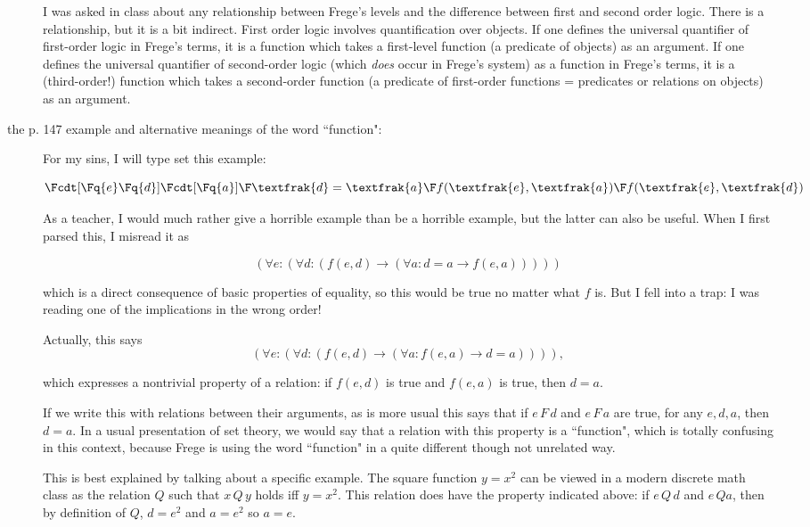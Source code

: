 \documentclass[12pt]{article}
\begin{document}
\begin{description}
I was asked in class about any relationship between Frege's levels and the difference between first and second order logic.  There is a relationship, but it is a bit indirect.
First order logic involves quantification over objects.  If one defines the universal quantifier of first-order logic in Frege's terms, it is a function which takes a first-level function
(a predicate of objects) as an argument.  If one defines the universal quantifier of second-order logic (which {\em does\/} occur in Frege's system) as a function in Frege's terms, 
it is a (third-order!) function which takes a second-order function (a predicate of first-order functions = predicates or relations on objects) as an argument.

\item[the p. 147 example and alternative meanings of the word ``function":]

For my sins, I will type set this example:

$$\Fcdt[\Fq{e}\Fq{d}]{\Fcdt[\Fq{a}]{\F \textfrak{d}=\textfrak{a}}{\F f(\textfrak{e},\textfrak{a})}}{\F f(\textfrak{e},\textfrak{d})} $$

As a teacher, I would much rather give a horrible example than be a horrible example, but the latter can also be useful.  When I first parsed this, I misread it as

$$(\forall e:(\forall d:(f(e,d) \rightarrow (\forall a:d=a \rightarrow f(e,a)))))$$

which is a direct consequence of basic properties of equality, so this would be true no matter what $f$ is.  But I fell into a trap:  I was reading one of the implications in the wrong order!

Actually, this says $$(\forall e:(\forall d:(f(e,d) \rightarrow (\forall a:f(e,a)\rightarrow d=a)))),$$

which expresses a nontrivial property of a relation:  if $f(e,d)$ is true and $f(e,a)$ is true, then $d=a$.

If we write this with relations between their arguments, as is more usual this says that if $e \, F\, d$ and $e\, F\, a$ are true, for any $e,d,a$, then $d=a$.  In a usual presentation of set theory, we would say that a relation with this property is a ``function", which is totally confusing in this context, because Frege is using the word ``function" in a quite different though not unrelated way.

This is best explained by talking about a specific example.  The square function $y=x^2$ can be viewed in a modern discrete math class as the relation $Q$ such that
$x \, Q \, y$ holds iff $y = x^2$.  This relation does have the property indicated above:  if $e \, Q\, d$ and $e \, Q a$, then by definition of $Q$, $d = e^2$ and
$a=e^2$ so $a=e$.


\end{description}
\end{document}
